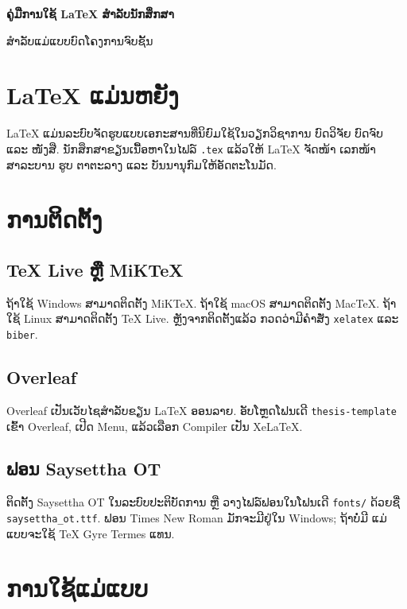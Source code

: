 \documentclass{../thesis}
\begin{document}
\begin{titlepage}
\centering
\vspace*{3cm}
{\bfseries\fontsize{18pt}{24pt}\selectfont ຄູ່ມືການໃຊ້ LaTeX ສຳລັບນັກສຶກສາ\par}
\vspace{1cm}
{\par}
\vfill
{\fontsize{14pt}{18pt}\selectfont ສຳລັບແມ່ແບບບົດໂຄງການຈົບຊັ້ນ\par}
\end{titlepage}

\tableofcontents
\clearpage

\chapter{LaTeX ແມ່ນຫຍັງ}
LaTeX ແມ່ນລະບົບຈັດຮູບແບບເອກະສານທີ່ນິຍົມໃຊ້ໃນວຽກວິຊາການ ບົດວິຈັຍ ບົດຈົບ ແລະ ໜັງສື. ນັກສຶກສາຂຽນເນື້ອຫາໃນໄຟລ໌ \texttt{.tex} ແລ້ວໃຫ້ LaTeX ຈັດໜ້າ ເລກໜ້າ ສາລະບານ ຮູບ ຕາຕະລາງ ແລະ ບັນນານຸກົມໃຫ້ອັດຕະໂນມັດ.

\chapter{ການຕິດຕັ້ງ}
\section{TeX Live ຫຼື MiKTeX}
ຖ້າໃຊ້ Windows ສາມາດຕິດຕັ້ງ MiKTeX. ຖ້າໃຊ້ macOS ສາມາດຕິດຕັ້ງ MacTeX. ຖ້າໃຊ້ Linux ສາມາດຕິດຕັ້ງ TeX Live. ຫຼັງຈາກຕິດຕັ້ງແລ້ວ ກວດວ່າມີຄຳສັ່ງ \texttt{xelatex} ແລະ \texttt{biber}.

\section{Overleaf}
Overleaf ເປັນເວັບໄຊສຳລັບຂຽນ LaTeX ອອນລາຍ. ອັບໂຫຼດໂຟນເດີ \texttt{thesis-template} ເຂົ້າ Overleaf, ເປີດ Menu, ແລ້ວເລືອກ Compiler ເປັນ XeLaTeX.

\section{ຟອນ Saysettha OT}
ຕິດຕັ້ງ Saysettha OT ໃນລະບົບປະຕິບັດການ ຫຼື ວາງໄຟລ໌ຟອນໃນໂຟນເດີ \texttt{fonts/} ດ້ວຍຊື່ \texttt{saysettha\_ot.ttf}. ຟອນ Times New Roman ມັກຈະມີຢູ່ໃນ Windows; ຖ້າບໍ່ມີ ແມ່ແບບຈະໃຊ້ TeX Gyre Termes ແທນ.

\chapter{ການໃຊ້ແມ່ແບບ}
\end{document}
